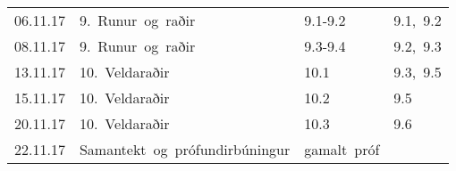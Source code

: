 \begin{longtable}{c|l|l|l}
\hline

06.11.17&
9.~Runur~og~raðir&
9.1-9.2&
9.1,~9.2\\
08.11.17&
9.~Runur~og~raðir&
9.3-9.4&
9.2,~9.3\\

\hline

13.11.17&
10.~Veldaraðir&
10.1&
9.3,~9.5\\
15.11.17&
10.~Veldaraðir&
10.2&
9.5\\

\hline

20.11.17&
10.~Veldaraðir&
10.3&
9.6\\
22.11.17&
Samantekt~og~prófundirbúningur&
gamalt~próf&
\\
\hline
\end{longtable}
